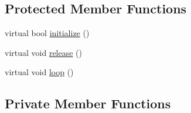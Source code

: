 \subsection*{\-Protected \-Member \-Functions}
\begin{DoxyCompactItemize}
\item 
virtual bool \hyperlink{classSteppingDemoClient_a08dce195eece162eed175ac9487667c2}{initialize} ()
\item 
virtual void \hyperlink{classSteppingDemoClient_aafcb227c0d7ce24823957e2331caa88b}{release} ()
\item 
virtual void \hyperlink{classSteppingDemoClient_a37dba4764b5849cf33c395cd0d4b0eb5}{loop} ()
\end{DoxyCompactItemize}
\subsection*{\-Private \-Member \-Functions}
